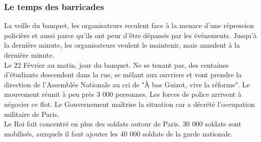 \documentclass[10pt, a4paper, openany]{book}
\begin{document}
\subsubsection{Le temps des barricades}

La veille du banquet, les organisateurs reculent face à la menace d'une répression policière et aussi parce qu'ils ont peur d'être dépassés par les événements. Jusqu'à la dernière minute, les organisateurs veulent le maintenir, mais annulent à la dernière minute. \\
Le 22 Février au matin, jour du banquet. Ne se tenant pas, des centaines d'étudiants descendent dans la rue, se mêlant aux ouvriers et vont prendre la direction de l'Assemblée Nationale au cri de "À bas Guizot, vive la réforme". Le mouvement réunit à peu près 3 000 personnes. Les forces de police arrivent à négocier ce flot. Le Gouvernement maîtrise la situation car a décrété l'occupation militaire de Paris. \\
Le Roi fait concentré en plus des soldats autour de Paris. 30 000 soldats sont mobilisés, auxquels il faut ajouter les 40 000 soldats de la garde nationale.
\end{document}
